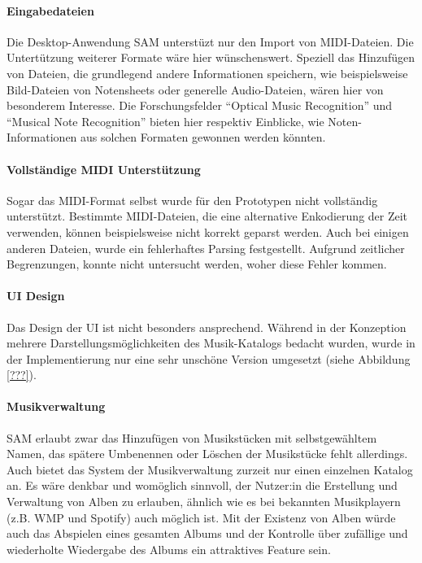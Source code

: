 \paragraph{Eingabedateien}
Die Desktop-Anwendung \ac{SAM} unterstüzt nur den Import von \ac{MIDI}-Dateien.
Die Untertützung weiterer Formate wäre hier wünschenswert.
Speziell das Hinzufügen von Dateien, die grundlegend andere Informationen speichern, wie beispielsweise Bild-Dateien von Notensheets oder generelle Audio-Dateien, wären hier von besonderem Interesse.
Die Forschungsfelder \enquote{Optical Music Recognition} und \enquote{Musical Note Recognition} bieten hier respektiv Einblicke, wie Noten-Informationen aus solchen Formaten gewonnen werden könnten.

\paragraph{Vollständige \ac{MIDI} Unterstützung}
Sogar das \ac{MIDI}-Format selbst wurde für den Prototypen nicht vollständig unterstützt.
Bestimmte \ac{MIDI}-Dateien, die eine alternative Enkodierung der Zeit verwenden, können beispielsweise nicht korrekt geparst werden.
Auch bei einigen anderen Dateien, wurde ein fehlerhaftes Parsing festgestellt.
Aufgrund zeitlicher Begrenzungen, konnte nicht untersucht werden, woher diese Fehler kommen.

\paragraph{\ac{UI} Design}
Das Design der \ac{UI} ist nicht besonders ansprechend.
Während in der Konzeption mehrere Darstellungsmöglichkeiten des Musik-Katalogs bedacht wurden, wurde in der Implementierung nur eine sehr unschöne Version umgesetzt (siehe Abbildung \ref{???}). %

\paragraph{Musikverwaltung}
\ac{SAM} erlaubt zwar das Hinzufügen von Musikstücken mit selbstgewähltem Namen, das spätere Umbenennen oder Löschen der Musikstücke fehlt allerdings.
Auch bietet das System der Musikverwaltung zurzeit nur einen einzelnen Katalog an.
Es wäre denkbar und womöglich sinnvoll, der Nutzer:in die Erstellung und Verwaltung von Alben zu erlauben, ähnlich wie es bei bekannten Musikplayern (z.B. \ac{WMP} und Spotify) auch möglich ist.
Mit der Existenz von Alben würde auch das Abspielen eines gesamten Albums und der Kontrolle über zufällige und wiederholte Wiedergabe des Albums ein attraktives Feature sein.

